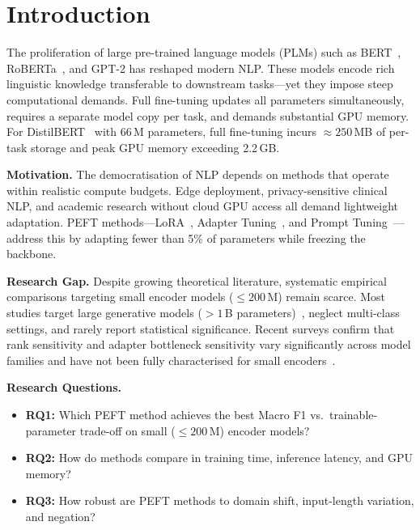 \documentclass[conference]{IEEEtran}
\begin{document}
\section{Introduction}
\label{sec:intro}

The proliferation of large pre-trained language models (PLMs) such as BERT~\cite{devlin2019bert}, RoBERTa~\cite{liu2019roberta}, and GPT-2 has reshaped modern NLP. These models encode rich linguistic knowledge transferable to downstream tasks---yet they impose steep computational demands. Full fine-tuning updates all parameters simultaneously, requires a separate model copy per task, and demands substantial GPU memory. For DistilBERT~\cite{sanh2019distilbert} with 66\,M parameters, full fine-tuning incurs ${\approx}250$\,MB of per-task storage and peak GPU memory exceeding 2.2\,GB.

\textbf{Motivation.} The democratisation of NLP depends on methods that operate within realistic compute budgets. Edge deployment, privacy-sensitive clinical NLP, and academic research without cloud GPU access all demand lightweight adaptation. PEFT methods---LoRA~\cite{hu2022lora}, Adapter Tuning~\cite{houlsby2019parameter}, and Prompt Tuning~\cite{lester2021power}---address this by adapting fewer than 5\% of parameters while freezing the backbone.

\textbf{Research Gap.} Despite growing theoretical literature, systematic empirical comparisons targeting small encoder models (${\leq}200$\,M) remain scarce. Most studies target large generative models ($>1$\,B parameters)~\cite{xu2023peft,lialin2023scaling}, neglect multi-class settings, and rarely report statistical significance. Recent surveys confirm that rank sensitivity and adapter bottleneck sensitivity vary significantly across model families and have not been fully characterised for small encoders~\cite{ding2023delta}.

\textbf{Research Questions.}
\begin{itemize}
  \item \textbf{RQ1:} Which PEFT method achieves the best Macro F1 vs.\ trainable-parameter trade-off on small (${\leq}200$\,M) encoder models?
  \item \textbf{RQ2:} How do methods compare in training time, inference latency, and GPU memory?
  \item \textbf{RQ3:} How robust are PEFT methods to domain shift, input-length variation, and negation?
\end{itemize}
\end{document}
